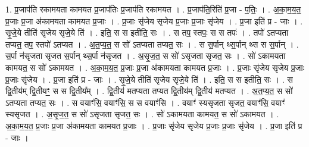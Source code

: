 \documentclass[17pt]{extarticle}
\begin{document}
1. प्र॒जाप॑ति रकामयता कामयत प्र॒जाप॑तिः प्र॒जाप॑ति रकामयत । . प्र॒जाप॑ति॒रिति॑ प्र॒जा - प॒तिः॒ । . अ॒का॒म॒य॒त॒ प्र॒जाः प्र॒जा अ॑कामयता कामयत प्र॒जाः । . प्र॒जाः सृ॑जेय सृजेय प्र॒जाः प्र॒जाः सृ॑जेय । . प्र॒जा इति॑ प्र - जाः । . सृ॒जे॒ये तीति॑ सृजेय सृजे॒ये ति॑ । . इति॒ स स इतीति॒ सः । . स तप॒ स्तपः॒ स स तपः॑ । . तपो॑ ऽतप्यता तप्यत॒ तप॒ स्तपो॑ ऽतप्यत । . अ॒त॒प्य॒त॒ स सो॑ ऽतप्यता तप्यत॒ सः । . स स॒र्पान् थ्स॒र्पान् थ्स स स॒र्पान् । . स॒र्पा न॑सृजता सृजत स॒र्पान् थ्स॒र्पा न॑सृजत । . अ॒सृ॒ज॒त॒ स सो॑ ऽसृजता सृजत॒ सः । . सो॑ ऽकामयता कामयत॒ स सो॑ ऽकामयत । . अ॒का॒म॒य॒त॒ प्र॒जाः प्र॒जा अ॑कामयता कामयत प्र॒जाः । . प्र॒जाः सृ॑जेय सृजेय प्र॒जाः प्र॒जाः सृ॑जेय । . प्र॒जा इति॑ प्र - जाः । . सृ॒जे॒ये तीति॑ सृजेय सृजे॒ये ति॑ । . इति॒ स स इतीति॒ सः । . स द्वि॒तीय॑म् द्वि॒तीयꣳ॒॒ स स द्वि॒तीय᳚म् । . द्वि॒तीय॑ मतप्यता तप्यत द्वि॒तीय॑म् द्वि॒तीय॑ मतप्यत । . अ॒त॒प्य॒त॒ स सो॑ ऽतप्यता तप्यत॒ सः । . स वयाꣳ॑सि॒ वयाꣳ॑सि॒ स स वयाꣳ॑सि । . वयाꣳ॑ स्यसृजता सृजत॒ वयाꣳ॑सि॒ वयाꣳ॑ स्यसृजत । . अ॒सृ॒ज॒त॒ स सो॑ ऽसृजता सृजत॒ सः । . सो॑ ऽकामयता कामयत॒ स सो॑ ऽकामयत । . अ॒का॒म॒य॒त॒ प्र॒जाः प्र॒जा अ॑कामयता कामयत प्र॒जाः । . प्र॒जाः सृ॑जेय सृजेय प्र॒जाः प्र॒जाः सृ॑जेय । . प्र॒जा इति॑ प्र - जाः । \newline
\end{document}
